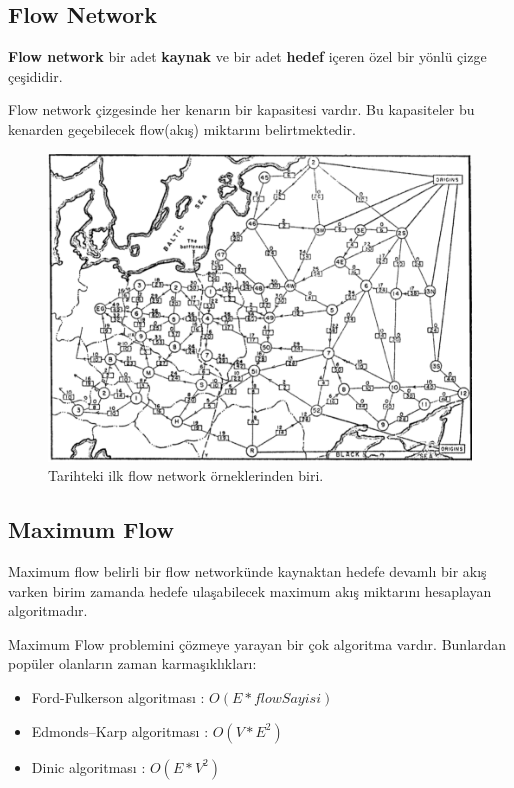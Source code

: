 \documentclass[12pt]{article}
\begin{document}
    \subsection{Flow Network}
    \textbf{Flow network} bir adet \textbf{kaynak} ve bir adet \textbf{hedef} içeren özel bir yönlü çizge çeşididir.


    Flow network çizgesinde her kenarın bir kapasitesi vardır. Bu kapasiteler bu kenarden geçebilecek flow(akış) miktarını belirtmektedir.
    
    \begin{figure}[H]
\centering
\includegraphics[width=\linewidth/3*2]{ilkflow.png}
\caption{Tarihteki ilk flow network örneklerinden biri.}
\label{fig:prime1}
\end{figure}

    
    \subsection{Maximum Flow}
    
    Maximum flow belirli bir flow networkünde kaynaktan hedefe devamlı bir akış varken birim zamanda hedefe ulaşabilecek maximum akış miktarını hesaplayan algoritmadır.
    
    Maximum Flow problemini çözmeye yarayan bir çok algoritma vardır. Bunlardan popüler olanların zaman karmaşıklıkları:
     \begin{itemize}
    \item Ford-Fulkerson algoritması : $O(E * flowSayisi)$
    \item Edmonds–Karp algoritması : $O(V * E^2)$
    \item Dinic algoritması : $O(E * V^2)$
    \end{itemize}
\end{document}
